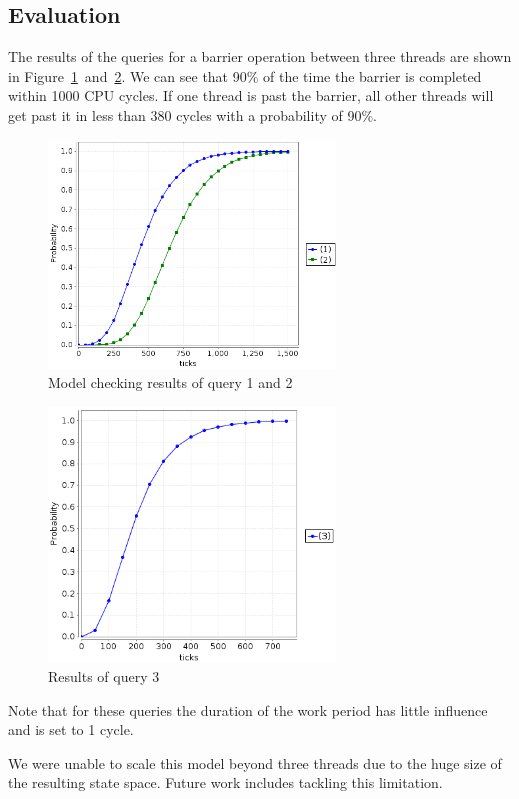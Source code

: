 \documentclass[a4paper, 10pt]{article}
\begin{document}
\subsection{Evaluation}
The results of the queries for a barrier operation between three threads are shown in Figure~\ref{fig:one-and-all}~and~\ref{fig:one2all}. We can see that 90\% of the time the barrier is completed within 1000 CPU cycles. If one thread is past the barrier, all other threads will get past it in less than 380 cycles with a probability of 90\%.
\begin{figure}[htbp]
	\centering
	\includegraphics[width=3in]{one-and-all}
	\caption{Model checking results of query 1 and 2}
	\label{fig:one-and-all}
\end{figure}
\begin{figure}[htbp]
	\centering
	\includegraphics[width=3in]{one2all}
	\caption{Results of query 3}
	\label{fig:one2all}
\end{figure}

Note that for these queries the duration of the work period has little influence and is set to 1 cycle.

We were unable to scale this model beyond three threads due to the huge size of the resulting state space. Future work includes tackling this limitation.
\end{document}
